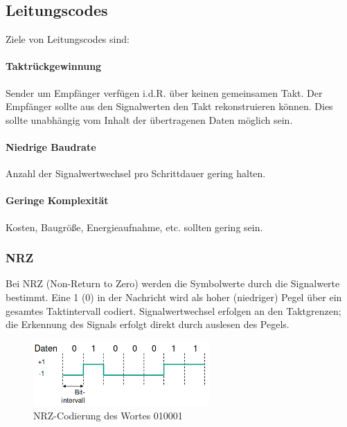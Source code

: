 \documentclass[a4paper, 14pt]{article}
\begin{document}
	\subsection{Leitungscodes}

	Ziele von Leitungscodes sind:

	\paragraph{Taktrückgewinnung}

	Sender um Empfänger verfügen i.d.R. über keinen gemeinsamen Takt.
	Der Empfänger sollte aus den Signalwerten den Takt rekonstruieren können.
	Dies sollte unabhängig vom Inhalt der übertragenen Daten möglich sein.

	\paragraph{Niedrige Baudrate}

	Anzahl der Signalwertwechsel pro Schrittdauer gering halten.

	\paragraph{Geringe Komplexität}

	Kosten, Baugröße, Energieaufnahme, etc. sollten gering sein.


	\subsubsection{NRZ}

	Bei NRZ (Non-Return to Zero) werden die Symbolwerte durch die Signalwerte bestimmt.
	Eine 1 (0) in der Nachricht wird als hoher (niedriger) Pegel über ein gesamtes Taktintervall codiert.
	Signalwertwechsel erfolgen an den Taktgrenzen; die Erkennung des Signals erfolgt direkt durch auslesen des Pegels.

	\begin{figure}
		\begin{center}
			\includegraphics[width=0.6\textwidth]{images/03-nrz.png}
		\end{center}
		\caption{NRZ-Codierung des Wortes 010001}
	\end{figure}
\end{document}
